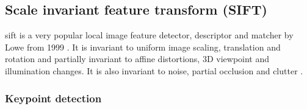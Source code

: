 \subsection[SIFT]{Scale invariant feature transform (SIFT)}
\label{subsec:sift}
\acrfull{sift} is a very popular local image feature detector, descriptor and matcher by Lowe from 1999 \cite{Lowe1999}. It is invariant to uniform image scaling, translation and rotation and partially invariant to affine distortions, 3D viewpoint and illumination changes. It is also invariant to noise, partial occlusion and clutter \cite{Lowe1999}. 

\subsubsection*{Keypoint detection}

